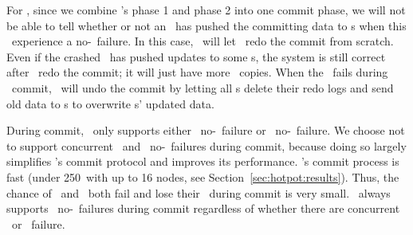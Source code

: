 For \mrsw, since we combine \mrmw's phase 1 and phase 2 into one commit phase,
we will not be able to tell whether or not an \on\ has pushed the committing data to \dn{}s 
when this \on\ experience a no-\nvm\ failure.
In this case, \hotpot\ will let \xn\ redo the commit from scratch. 
Even if the crashed \on\ has pushed updates to some \dn{}s,
the system is still correct after \xn\ redo the commit;
it will just have more \redundant\ copies.
When the \xn\ fails during \mrsw\ commit, \hotpot\ will undo the commit
by letting all \on{}s delete their redo logs and send old data to \dn{}s to overwrite \dn{}s' updated data.

During commit, \hotpot\ only supports either \xn\ no-\nvm\ failure or \on\ no-\nvm\ failure.
We choose not to support concurrent \xn\ and \on\ no-\nvm\ failures during commit,
because doing so largely simplifies \hotpot's commit protocol and improves its performance.
\hotpot's commit process is fast (under 250\mus\ with up to 16 nodes, see Section~\ref{sec:hotpot:results}).
Thus, the chance of \xn\ and \on\ both fail and lose their \nvm\ during commit is very small.
\hotpot\ always supports \dn\ no-\nvm\ failures during commit regardless of whether there are concurrent \xn\ or \on\ failure.

